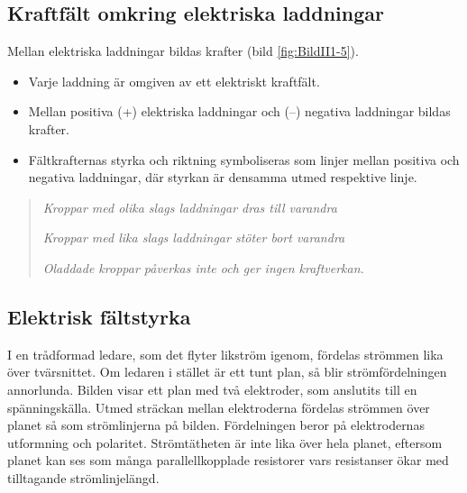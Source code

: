 
\subsection{Kraftfält omkring elektriska laddningar}


\noindent
Mellan elektriska laddningar bildas krafter (bild \ref{fig:BildII1-5}).

\begin{itemize}
  \item Varje laddning är omgiven av ett elektriskt kraftfält.
  \item Mellan positiva (+) elektriska laddningar och (--) negativa laddningar
  bildas krafter.
  \item Fältkrafternas styrka och riktning symboliseras som linjer mellan
  positiva och negativa laddningar, där styrkan är densamma utmed respektive
  linje.
\end{itemize}


\begin{quote}
\emph{Kroppar med olika slags laddningar dras till varandra}

\emph{Kroppar med lika slags laddningar stöter bort varandra}

\emph{Oladdade kroppar påverkas inte och ger ingen kraftverkan.}
\end{quote}

\subsection{Elektrisk fältstyrka}
\label{elektrisk_fälststyrka}


I en trådformad ledare, som det flyter likström igenom, fördelas strömmen lika
över tvärsnittet.
Om ledaren i stället är ett tunt plan, så blir strömfördelningen annorlunda.
Bilden visar ett plan med två elektroder, som anslutits till en spänningskälla.
Utmed sträckan mellan elektroderna fördelas strömmen över planet så som
strömlinjerna på bilden.
Fördelningen beror på elektrodernas utformning och polaritet.
Strömtätheten är inte lika över hela planet, eftersom planet kan ses som många
parallellkopplade resistorer vars resistanser ökar med tilltagande
strömlinjelängd.

